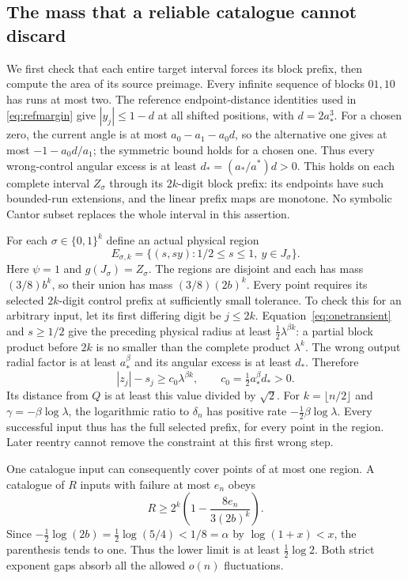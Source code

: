 \documentclass[11pt]{amsart}
\theoremstyle{definition}
\theoremstyle{remark}
\numberwithin{equation}{section}
\begin{document}
\subsection{The mass that a reliable catalogue cannot discard}
We first check that each entire target interval forces its block
prefix, then compute the area of its source preimage. Every infinite
sequence of blocks $01,10$ has runs at most two.
The reference endpoint-distance identities used in
\eqref{eq:refmargin} give $|y_j|\le1-d$ at all shifted positions,
with $d=2a_*^3$. For a chosen zero, the current angle is at most
$a_0-a_1-a_0d$, so the alternative one gives at most
$-1-a_0d/a_1$; the symmetric bound holds for a chosen one.
Thus every wrong-control angular excess is at least
$d_*=(a_*/a^*)d>0$.
This holds on each complete interval $Z_\sigma$ through its
$2k$-digit block prefix: its endpoints have such bounded-run
extensions, and the linear prefix maps are monotone. No symbolic
Cantor subset replaces the whole interval in this assertion.

For each $\sigma\in\{0,1\}^k$ define an actual physical region
\[
E_{\sigma,k}=\{(s,sy):1/2\le s\le1,\ y\in J_\sigma\}.
\]
Here $\psi=1$ and $g(J_\sigma)=Z_\sigma$.
The regions are disjoint and each has mass
$(3/8)b^k$, so their union has mass $(3/8)(2b)^k$.
Every point requires its selected $2k$-digit control prefix at
sufficiently small tolerance. To check this for an arbitrary input,
let its first differing digit be $j\le2k$.
Equation~\eqref{eq:onetransient} and $s\ge1/2$ give the
preceding physical radius at least
$\tfrac12\lambda^{\beta k}$: a partial block product before
$2k$ is no smaller than the complete product $\lambda^k$.
The wrong output radial factor is at least $a_*^\beta$ and
its angular excess is at least $d_*$. Therefore
\begin{equation}\label{eq:cantorwrong}
|z_j|-s_j\ge c_0\lambda^{\beta k},
\qquad c_0=\tfrac12a_*^\beta d_*>0.
\end{equation}
Its distance from $Q$ is at least this value divided by $\sqrt2$.
For $k=\lfloor n/2\rfloor$ and
$\gamma=-\beta\log\lambda$, the logarithmic ratio to $\delta_n$
has positive rate $-\tfrac12\beta\log\lambda$.
Every successful input thus has the full selected prefix, for every
point in the region. Later reentry cannot remove the constraint
at this first wrong step.

One catalogue input can consequently cover points of at most one
region. A catalogue of $R$ inputs with failure at most $e_n$ obeys
\begin{equation}\label{eq:cantorcount}
R\ge2^k\left(1-\frac{8e_n}{3(2b)^k}\right).
\end{equation}
Since $-\tfrac12\log(2b)=\tfrac12\log(5/4)<1/8=\alpha$
by $\log(1+x)<x$, the parenthesis tends to one.
Thus the lower limit is at least $\tfrac12\log2$.
Both strict exponent gaps absorb all the allowed $o(n)$ fluctuations.
\end{document}
